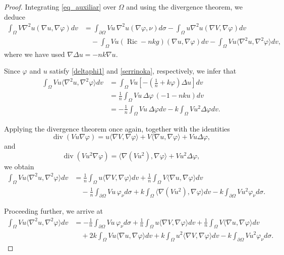\documentclass[10pt,a4paper]{amsart}
\begin{document}
\begin{proof}
Integrating \eqref{eq_auxiliar} over \(\Omega\) and using the divergence theorem, we deduce
\begin{align}\label{eq47}
\int_{\Omega}V\nabla^{2}u(\nabla u,\nabla\varphi)dv
&=
\int_{\partial\Omega}Vu\,\nabla^{2}u(\nabla\varphi,\nu)d\sigma
-
\int_{\Omega}u\nabla^{2}u(\nabla V,\nabla\varphi)dv
\nonumber\\
&\quad
-
\int_{\Omega}Vu(\operatorname{Ric}-nkg)(\nabla u,\nabla\varphi)dv
-
\int_{\Omega}Vu\langle\nabla^{2}u,\nabla^{2}\varphi\rangle dv,
\end{align}
where we have used \(\nabla\Delta u=-nk\nabla u\).

Since \(\varphi\) and \(u\) satisfy \eqref{deltaphi1} and \eqref{serrinoka}, respectively, we infer that
\begin{align}
\int_{\Omega}Vu\langle\nabla^{2}u,\nabla^{2}\varphi\rangle dv
&=
\int_{\Omega}Vu\left[-\left(\frac{1}{n}+k\varphi\right)\Delta u\right]dv
\nonumber\\
&=
\frac{1}{n}\int_{\Omega}Vu\,\Delta\varphi\,(-1-nku)dv
\nonumber\\
&=
-\frac{1}{n}\int_{\Omega}Vu\,\Delta\varphi dv
-k\int_{\Omega}Vu^{2}\Delta\varphi dv.
\nonumber
\end{align}

Applying the divergence theorem once again, together with the identities
\[
\operatorname{div}(Vu\nabla\varphi)
=
u\langle\nabla V,\nabla\varphi\rangle
+
V\langle\nabla u,\nabla\varphi\rangle
+
Vu\Delta\varphi,
\]
and
\[
\operatorname{div}(Vu^{2}\nabla\varphi)
=
\langle\nabla(Vu^{2}),\nabla\varphi\rangle
+
Vu^{2}\Delta\varphi,
\]
we obtain
\begin{align}
\int_{\Omega}Vu\langle\nabla^{2}u,\nabla^{2}\varphi\rangle dv
&=
\frac{1}{n}\int_{\Omega}u\langle\nabla V,\nabla\varphi\rangle dv
+
\frac{1}{n}\int_{\Omega}V\langle\nabla u,\nabla\varphi\rangle dv
\nonumber\\
&\quad
-
\frac{1}{n}\int_{\partial\Omega}Vu\,\varphi_{\nu}d\sigma
+
k\int_{\Omega}\langle\nabla(Vu^{2}),\nabla\varphi\rangle dv
-
k\int_{\partial\Omega}Vu^{2}\varphi_{\nu}d\sigma.
\nonumber
\end{align}

Proceeding further, we arrive at
\begin{align}\label{eq48}
\int_{\Omega}Vu\langle\nabla^{2}u,\nabla^{2}\varphi\rangle dv
&=
-\frac{1}{n}\int_{\partial\Omega}Vu\,\varphi_{\nu}d\sigma
+
\frac{1}{n}\int_{\Omega}u\langle\nabla V,\nabla\varphi\rangle dv
+
\frac{1}{n}\int_{\Omega}V\langle\nabla u,\nabla\varphi\rangle dv
\nonumber\\
&\quad
+
2k\int_{\Omega}Vu\langle\nabla u,\nabla\varphi\rangle dv
+
k\int_{\Omega}u^{2}\langle\nabla V,\nabla\varphi\rangle dv
-
k\int_{\partial\Omega}Vu^{2}\varphi_{\nu}d\sigma.
\end{align}


\end{proof}
\end{document}
